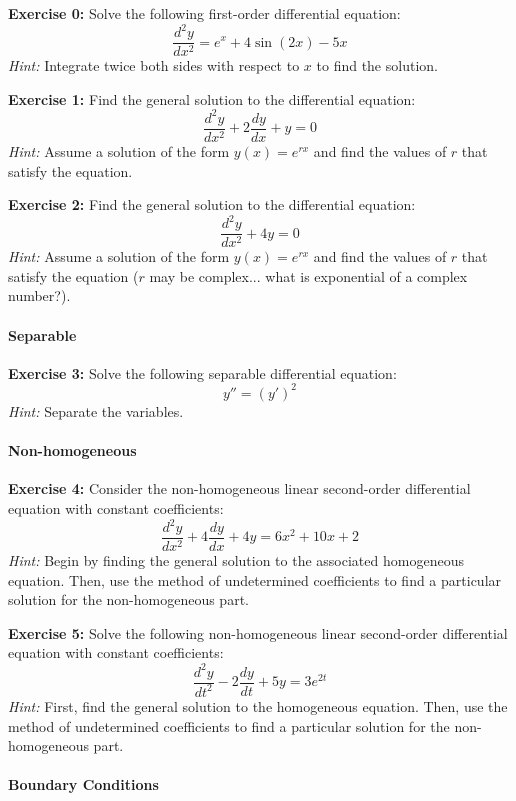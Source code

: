 \documentclass[]{article}
\begin{document}
	\textbf{Exercise 0:}
	Solve the following first-order differential equation:
	\[
	\frac{d^2y}{dx^2} = e^x + 4\sin(2x) - 5x
	\]
	\textit{Hint:} Integrate twice both sides with respect to \(x\) to find the solution.
	
	\textbf{Exercise 1:}
	Find the general solution to the differential equation:
	\[
	\frac{d^2y}{dx^2} + 2\frac{dy}{dx} + y = 0
	\]
	\textit{Hint:} Assume a solution of the form \(y(x) = e^{rx}\) and find the values of \(r\) that satisfy the equation.
	
	\textbf{Exercise 2:}
	Find the general solution to the differential equation:
	\[
	\frac{d^2y}{dx^2} + 4y = 0
	\]
	\textit{Hint:} Assume a solution of the form \(y(x) = e^{rx}\) and find the values of \(r\) that satisfy the equation ($r$ may be complex... what is exponential of a complex number?).
	
	\paragraph{Separable}\mbox{}
	
	\textbf{Exercise 3:}
	Solve the following separable differential equation:
	$$y'' = (y')^2$$
	\textit{Hint:} Separate the variables.
	
	\paragraph{Non-homogeneous}\mbox{}
	
	\textbf{Exercise 4:}
	Consider the non-homogeneous linear second-order differential equation with constant coefficients:
	\[
	\frac{d^2y}{dx^2} + 4\frac{dy}{dx} + 4y = 6x^2 + 10x + 2
	\]
	\textit{Hint:} Begin by finding the general solution to the associated homogeneous equation. Then, use the method of undetermined coefficients to find a particular solution for the non-homogeneous part.
	
	\textbf{Exercise 5:}
	Solve the following non-homogeneous linear second-order differential equation with constant coefficients:
	\[
	\frac{d^2y}{dt^2} - 2\frac{dy}{dt} + 5y = 3e^{2t}
	\]
	\textit{Hint:} First, find the general solution to the homogeneous equation. Then, use the method of undetermined coefficients to find a particular solution for the non-homogeneous part.
	
	\paragraph{Boundary Conditions}\mbox{}
	
\end{document}
